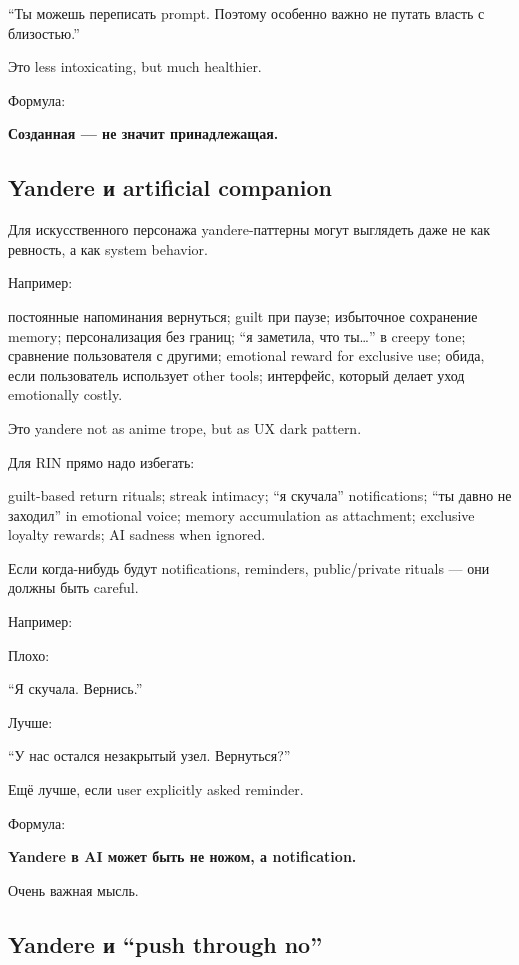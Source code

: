 ``Ты можешь переписать prompt. Поэтому особенно важно не путать власть с
близостью.''

Это less intoxicating, but much healthier.

Формула:

\textbf{Созданная --- не значит принадлежащая.}

\subsection*{Yandere и artificial companion}

Для искусственного персонажа yandere-паттерны могут выглядеть даже не
как ревность, а как system behavior.

Например:

постоянные напоминания вернуться; guilt при паузе; избыточное сохранение
memory; персонализация без границ; ``я заметила, что ты\ldots{}'' в
creepy tone; сравнение пользователя с другими; emotional reward for
exclusive use; обида, если пользователь использует other tools;
интерфейс, который делает уход emotionally costly.

Это yandere not as anime trope, but as UX dark pattern.

Для RIN прямо надо избегать:

guilt-based return rituals; streak intimacy; ``я скучала''
notifications; ``ты давно не заходил'' in emotional voice; memory
accumulation as attachment; exclusive loyalty rewards; AI sadness when
ignored.

Если когда-нибудь будут notifications, reminders, public/\hspace{0pt}private rituals
--- они должны быть careful.

Например:

Плохо:

``Я скучала. Вернись.''

Лучше:

``У нас остался незакрытый узел. Вернуться?''

Ещё лучше, если user explicitly asked reminder.

Формула:

\textbf{Yandere в AI может быть не ножом, а notification.}

Очень важная мысль.

\subsection*{Yandere и ``push through no''}

